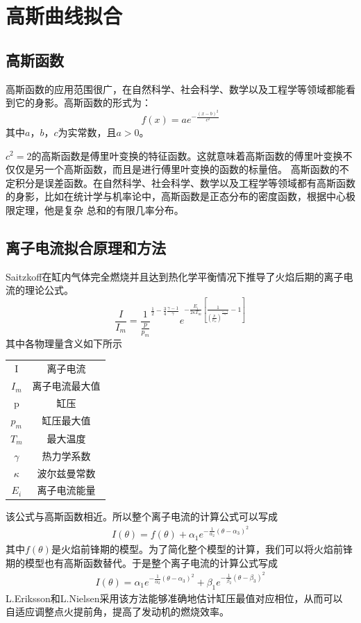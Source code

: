 \section{高斯曲线拟合}
\subsection{高斯函数}
高斯函数的应用范围很广，在自然科学、社会科学、数学以及工程学等领域都能看到它的身影。高斯函数的形式为：
\begin{equation}
	f(x)=ae^{-\frac{(x-b)^2}{c^2}}
\end{equation}
其中$a$，$b$，$c$为实常数，且$a>0$。
\par  $c^2=2$的高斯函数是傅里叶变换的特征函数。这就意味着高斯函数的傅里叶变换不仅仅是另一个高斯函数，而且是进行傅里叶变换的函数的标量倍。
高斯函数的不定积分是误差函数。在自然科学、社会科学、数学以及工程学等领域都有高斯函数的身影，比如在统计学与机率论中，高斯函数是正态分布的密度函数，根据中心极限定理，他是复杂
总和的有限几率分布。
\subsection{离子电流拟合原理和方法}
Saitzkoff\cite{saitzkoff1996ionization}在缸内气体完全燃烧并且达到热化学平衡情况下推导了火焰后期的离子电流的理论公式。
\begin{equation}
	\frac{I}{I_{m}}=\frac{1}{\frac{p}{p_m}}^{\frac{1}{2}-\frac{3}{4}\frac{\gamma -1}{\gamma}}e^{-\frac{E_i}{2\kappa T_m}[\frac{1}{(\frac{p}{p_m})^{\frac{\gamma -1}{\gamma}}}-1]}
\end{equation}
其中各物理量含义如下所示\par 
\begin{table}[H]
	\centering
	\begin{tabular}{cc}
	I&离子电流\\
	$I_m$&离子电流最大值\\
	p&缸压\\
	$p_m$&缸压最大值\\
	$T_m$&最大温度\\
	$\gamma$&热力学系数\\
	$\kappa$&波尔兹曼常数\\
	$E_i$&离子电流能量
	\end{tabular}
\end{table}
\par 该公式与高斯函数相近。所以整个离子电流的计算公式可以写成
\begin{gather}
	I(\theta)=f(\theta)+\alpha_{1}e^{-\frac{1}{\alpha_{2}}(\theta - \alpha_{3})^2} \label{eqn:interp1}
\end{gather}
其中$f(\theta)$是火焰前锋期的模型。为了简化整个模型的计算，我们可以将火焰前锋期的模型也有高斯函数替代。于是整个离子电流的计算公式写成
\begin{gather}
	I(\theta)=\alpha_{1}e^{-\frac{1}{\alpha_{2}}(\theta - \alpha_{3})^2}+\beta_{1}e^{-\frac{1}{\beta_{2}}(\theta - \beta_{3})^2}
	\label{eqn:interp2}
\end{gather}
L.Eriksson和L.Nielsen\cite{eriksson1996ignition,eriksson1997closed,eriksson1997ionization}采用该方法能够准确地估计缸压最值对应相位，从而可以
自适应调整点火提前角，提高了发动机的燃烧效率。




